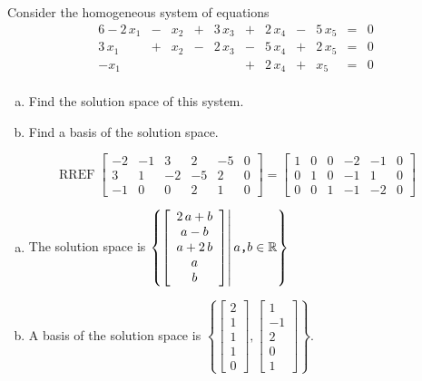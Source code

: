 
\begin{exerciseStatement}


Consider the homogeneous system of equations 
\begin{alignat*}{6} -2 \, x_{1} &-& x_{2} &+& 3 \, x_{3} &+& 2 \, x_{4} &-& 5 \, x_{5} &=& 0 \\3 \, x_{1} &+& x_{2} &-& 2 \, x_{3} &-& 5 \, x_{4} &+& 2 \, x_{5} &=& 0 \\-x_{1} & &  & &  &+& 2 \, x_{4} &+& x_{5} &=& 0 \\ \end{alignat*}
            


\begin{enumerate}[(a)]
\item  Find the solution space of this system.
\item  Find a basis of the solution space.
\end{enumerate}
    
\end{exerciseStatement}
    
\begin{exerciseAnswer} 


\[\operatorname{RREF} \left[\begin{array}{ccccc|c}
-2 & -1 & 3 & 2 & -5 & 0 \\
3 & 1 & -2 & -5 & 2 & 0 \\
-1 & 0 & 0 & 2 & 1 & 0
\end{array}\right] = \left[\begin{array}{ccccc|c}
1 & 0 & 0 & -2 & -1 & 0 \\
0 & 1 & 0 & -1 & 1 & 0 \\
0 & 0 & 1 & -1 & -2 & 0
\end{array}\right] \]


\begin{enumerate}[(a)]
\item The solution space is \( \left\{ \left[\begin{array}{c}
2 \, a + b \\
a - b \\
a + 2 \, b \\
a \\
b
\end{array}\right] \middle|\,a\text{\texttt{,}}b\in\mathbb{R}\right\} \)
\item A basis of the solution space is \( \left\{ \left[\begin{array}{c}
2 \\
1 \\
1 \\
1 \\
0
\end{array}\right] , \left[\begin{array}{c}
1 \\
-1 \\
2 \\
0 \\
1
\end{array}\right] \right\} \).
\end{enumerate}
    
\end{exerciseAnswer}
    
